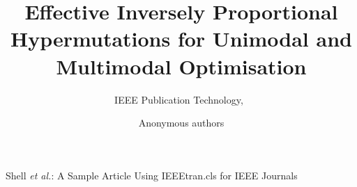 \documentclass[lettersize,journal]{IEEEtran}
\begin{document}
\title{Effective Inversely Proportional Hypermutations for Unimodal and Multimodal Optimisation}

\author{IEEE Publication Technology,~	
        
}
	\author{Anonymous authors	

}

%
{Shell \MakeLowercase{\textit{et al.}}: A Sample Article Using IEEEtran.cls for IEEE Journals}


\maketitle
\end{document}
